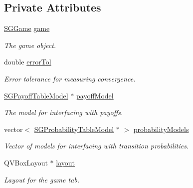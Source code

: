 \subsection*{Private Attributes}
\begin{DoxyCompactItemize}
\item 
\hyperlink{classSGGame}{S\+G\+Game} \hyperlink{classSGGameHandler_ac95a8d363c98979cbbd8fc63a112bf11}{game}
\begin{DoxyCompactList}\small\item\em The game object. \end{DoxyCompactList}\item 
\mbox{\label{classSGGameHandler_a43b882271dcb9673494a960d469cd2df}} 
double \hyperlink{classSGGameHandler_a43b882271dcb9673494a960d469cd2df}{error\+Tol}
\begin{DoxyCompactList}\small\item\em Error tolerance for measuring convergence. \end{DoxyCompactList}\item 
\mbox{\label{classSGGameHandler_a515fcf42da91b1181f9663c280caf48b}} 
\hyperlink{classSGPayoffTableModel}{S\+G\+Payoff\+Table\+Model} $\ast$ \hyperlink{classSGGameHandler_a515fcf42da91b1181f9663c280caf48b}{payoff\+Model}
\begin{DoxyCompactList}\small\item\em The model for interfacing with payoffs. \end{DoxyCompactList}\item 
\mbox{\label{classSGGameHandler_a4f7c265204b97594fe70e98ddc4fb559}} 
vector$<$ \hyperlink{classSGProbabilityTableModel}{S\+G\+Probability\+Table\+Model} $\ast$ $>$ \hyperlink{classSGGameHandler_a4f7c265204b97594fe70e98ddc4fb559}{probability\+Models}
\begin{DoxyCompactList}\small\item\em Vector of models for interfacing with transition probabilities. \end{DoxyCompactList}\item 
\mbox{\label{classSGGameHandler_a2cf4dd4571399321e16d89d882d08715}} 
Q\+V\+Box\+Layout $\ast$ \hyperlink{classSGGameHandler_a2cf4dd4571399321e16d89d882d08715}{layout}
\begin{DoxyCompactList}\small\item\em Layout for the game tab. \end{DoxyCompactList}\item 

\end{DoxyCompactItemize}
